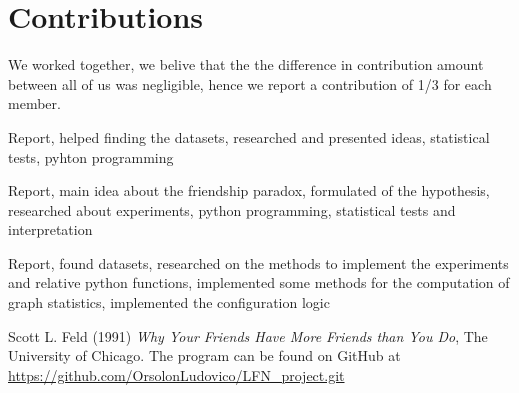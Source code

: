 \documentclass{article}
\begin{document}
\section*{Contributions}
We worked together, we belive that the the difference in contribution amount between all of us was negligible, hence we report a contribution of 1/3 for each member.
\begin{description}[font=\normalfont\itshape]
    \item[Lavorati Ippolito:] Report, helped finding the datasets, researched and presented ideas, statistical tests, pyhton programming
    \item[Orsolon Ludovico:] Report, main idea about the friendship paradox, formulated of the hypothesis, researched about experiments, python programming, statistical tests and interpretation
    \item[Stefani Patrizia:] Report, found datasets, researched on the methods to implement the experiments and relative python functions, implemented some methods for the computation of graph statistics, implemented the configuration logic
\end{description}
\begin{thebibliography}{9}
Scott L. Feld (1991) \emph{Why Your Friends Have More Friends
than You Do}, The University of Chicago.
The program can be found on GitHub at \url{https://github.com/OrsolonLudovico/LFN_project.git}
\end{thebibliography}
\end{document}
